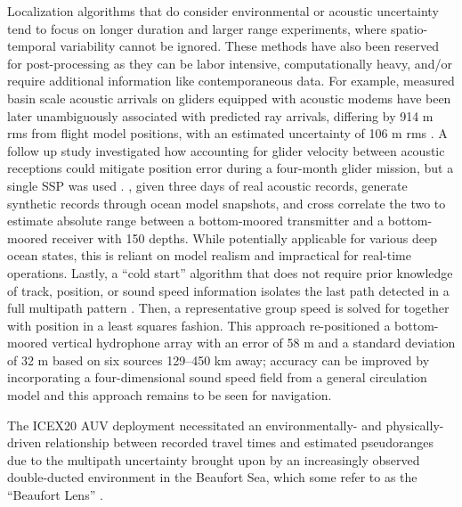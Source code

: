 \documentclass[preprint,TurnOnLineNumbers]{JASA}
\begin{document}
Localization algorithms that do consider environmental or acoustic uncertainty tend to focus on longer duration and larger range experiments, where spatio-temporal variability cannot be ignored.
These methods have also been reserved for post-processing as they can be labor intensive, computationally heavy, and/or require additional information like contemporaneous data.
For example, measured basin scale acoustic arrivals on gliders equipped with acoustic modems have been later unambiguously associated with predicted ray arrivals, differing by 914 m rms from flight model positions, with an estimated uncertainty of 106 m rms \cite{VanUffelen2013}.
A follow up study investigated how accounting for glider velocity between acoustic receptions could mitigate position error during a four-month glider mission, but a single SSP was used \cite{vanuffelen2016localization}.
\citet{Wu2019}, given three days of real acoustic records, generate synthetic records through ocean model snapshots, and cross correlate the two to estimate absolute range between a bottom-moored transmitter and a bottom-moored receiver with 150 depths. 
While potentially applicable for various deep ocean states, this is reliant on model realism and impractical for real-time operations.
Lastly, a ``cold start'' algorithm that does not require prior knowledge of track, position, or sound speed information isolates the last path detected in a full multipath pattern \citep{Mikhalevsky2020}.
Then, a representative group speed is solved for together with position in a least squares fashion. 
This approach re-positioned a bottom-moored vertical hydrophone array with an error of 58 m and a standard deviation of 32 m based on six sources 129--450 km away; accuracy can be improved by incorporating a four-dimensional sound speed field from a general circulation model and this approach remains to be seen for navigation.

The ICEX20 AUV deployment necessitated an environmentally- and physically-driven relationship between recorded travel times and estimated pseudoranges due to the multipath uncertainty brought upon by an increasingly observed double-ducted environment in the Beaufort Sea, which some refer to as the ``Beaufort Lens'' \citep{litvak2015,chen_spectral_2019,chen_temporal_2020}.
\end{document}
